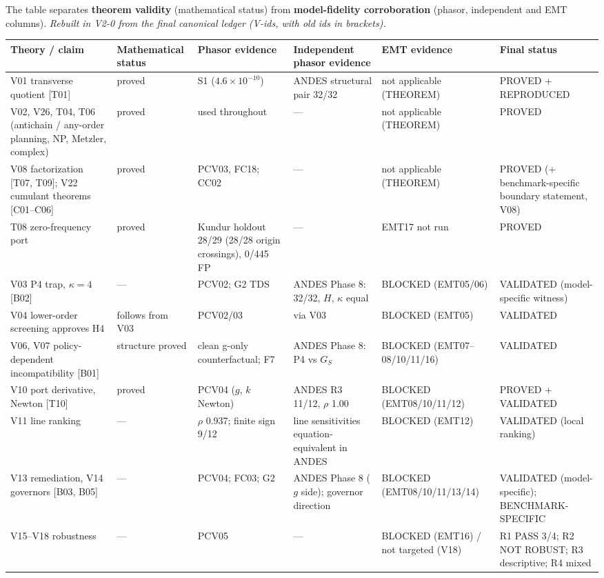 \documentclass[10pt,a4paper]{article}
\begin{document}
The table separates \textbf{theorem validity} (mathematical status) from
\textbf{model-fidelity corroboration} (phasor, independent and EMT columns).
\emph{Rebuilt in V2-0 from the final canonical ledger (V-ids, with old ids in
brackets).}

{\footnotesize
\begin{longtable}{@{}L{3.0cm}L{1.5cm}L{2.0cm}L{2.0cm}L{3.1cm}L{3.0cm}@{}}
\toprule
Theory / claim & Mathem\-atical status & Phasor evidence & Independent phasor evidence & EMT evidence & Final status\\
\midrule\endhead
V01 transverse quotient [T01] & proved & S1 ($4.6\times10^{-10}$) & ANDES structural pair 32/32 & not applicable (THEOREM) & PROVED + REPRODUCED\\
V02, V26, T04, T06 (antichain / any-order planning, NP, Metzler, complex) & proved & used throughout & --- & not applicable (THEOREM) & PROVED\\
V08 factorization [T07, T09]; V22 cumulant theorems [C01--C06] & proved & PCV03, FC18; CC02 & --- & not applicable (THEOREM) & PROVED (+ benchmark-specific boundary statement, V08)\\
T08 zero-frequency port & proved & Kundur holdout 28/29 (28/28 origin crossings), 0/445 FP & --- & EMT17 not run & PROVED\\
V03 P4 trap, $\kappa=4$ [B02] & --- & PCV02; G2 TDS & ANDES Phase 8: 32/32, $H$, $\kappa$ equal & BLOCKED (EMT05/06) & VALIDATED (model-specific witness)\\
V04 lower-order screening approves H4 & follows from V03 & PCV02/03 & via V03 & BLOCKED (EMT05) & VALIDATED\\
V06, V07 policy-dependent incompatibility [B01] & structure proved & clean g-only counterfactual; F7 & ANDES Phase 8: P4 vs $G_S$ & BLOCKED (EMT07--08/10/11/16) & VALIDATED\\
V10 port derivative, Newton [T10] & proved & PCV04 ($g$, $k$ Newton) & ANDES R3 11/12, $\rho$ 1.00 & BLOCKED (EMT08/10/11/12) & PROVED + VALIDATED\\
V11 line ranking & --- & $\rho$ 0.937; finite sign 9/12 & line sensitivities equation-equivalent in ANDES & BLOCKED (EMT12) & VALIDATED (local ranking)\\
V13 remediation, V14 governors [B03, B05] & --- & PCV04; FC03; G2 & ANDES Phase 8 ($g$ side); governor direction & BLOCKED (EMT08/10/11/13/14) & VALIDATED (model-specific); BENCHMARK-SPECIFIC\\
V15--V18 robustness & --- & PCV05 & --- & BLOCKED (EMT16) / not targeted (V18) & R1 PASS 3/4; R2 NOT ROBUST; R3 descriptive; R4 mixed\\

\end{longtable}}
\end{document}
